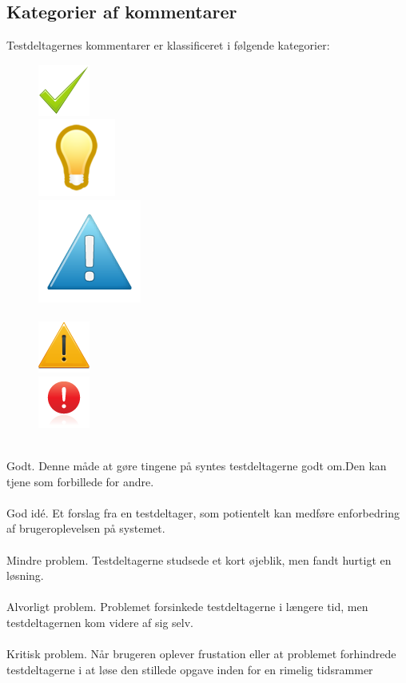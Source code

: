\documentclass[12pt]{article}
\begin{document}
\subsection*{Kategorier af kommentarer}
Testdeltagernes kommentarer er klassificeret i følgende kategorier: \vspace{1mm}
 \begin{figure}
  \includegraphics[scale=0.4]{Billeder/godt} \vspace{5mm} \\
  \includegraphics[scale=0.3]{Billeder/ide}   \vspace{3mm}\\
  \includegraphics[scale=0.3]{Billeder/mindre}  \\ \\
  \includegraphics[scale=0.5]{Billeder/alvorligt}   \\
    \includegraphics[scale=0.6]{Billeder/kritisk}
\end{figure}\\ 
Godt. Denne måde at gøre tingene på syntes testdeltagerne godt om.Den kan tjene som forbillede for andre.\\ \\
God idé. Et forslag fra en testdeltager, som potientelt kan medføre enforbedring af brugeroplevelsen på systemet. \\ \\
Mindre problem. Testdeltagerne studsede et kort øjeblik, men fandt hurtigt en løsning. \\ \\
Alvorligt problem. Problemet forsinkede testdeltagerne i længere tid, men testdeltagernen kom videre af sig selv. \\ \\
Kritisk problem. Når brugeren oplever frustation eller at problemet forhindrede testdeltagerne i at løse den stillede opgave inden for en rimelig tidsrammer\\
\end{document}
